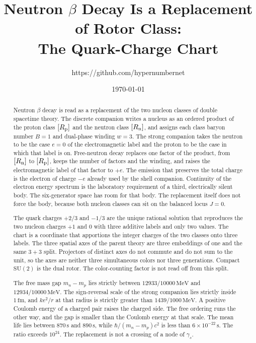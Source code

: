 \documentclass[a4paper]{article}
\title{Neutron \(\beta\) Decay Is a Replacement of Rotor Class:\\
The Quark-Charge Chart}
\author{https://github.com/hypernumbernet}
\date{\today}
\begin{document}
\maketitle

\begin{abstract}
Neutron \(\beta\) decay is read as a replacement of the two nucleon classes of double spacetime theory. The discrete companion writes a nucleus as an ordered product of the proton class \([R_{\rm p}]\) and the neutron class \([R_{\rm n}]\), and assigns each class baryon number \(B=1\) and dual-phase winding \(w=3\). The strong companion takes the neutron to be the case \(e=0\) of the electromagnetic label and the proton to be the case in which that label is on. Free-neutron decay replaces one factor of the product, from \([R_{\rm n}]\) to \([R_{\rm p}]\), keeps the number of factors and the winding, and raises the electromagnetic label of that factor to \(+e\). The emission that preserves the total charge is the electron of charge \(-e\) already used by the shell companion. Continuity of the electron energy spectrum is the laboratory requirement of a third, electrically silent body. The six-generator space has room for that body. The replacement itself does not force the body, because both nucleon classes can sit on the balanced locus \(J=0\).

The quark charges \(+2/3\) and \(-1/3\) are the unique rational solution that reproduces the two nucleon charges \(+1\) and \(0\) with three additive labels and only two values. The chart is a coordinate that apportions the integer charges of the two classes onto three labels. The three spatial axes of the parent theory are three embeddings of one and the same \(3+3\) split. Projectors of distinct axes do not commute and do not sum to the unit, so the axes are neither three simultaneous colors nor three generations. Compact \(\mathrm{SU}(2)\) is the dual rotor. The color-counting factor is not read off from this split.

The free mass gap \(m_n-m_p\) lies strictly between \(12933/10000\,\mathrm{MeV}\) and \(12934/10000\,\mathrm{MeV}\). The sign-reversal scale of the strong companion lies strictly inside \(1\,\mathrm{fm}\), and \(ke^{2}/r\) at that radius is strictly greater than \(1439/1000\,\mathrm{MeV}\). A positive Coulomb energy of a charged pair raises the charged side. The free ordering runs the other way, and the gap is smaller than the Coulomb energy at that scale. The mean life lies between \(870\,\mathrm{s}\) and \(890\,\mathrm{s}\), while \(\hbar/(m_n-m_p)c^{2}\) is less than \(6\times 10^{-22}\,\mathrm{s}\). The ratio exceeds \(10^{24}\). The replacement is not a crossing of a node of \(\gamma_s\).


\end{abstract}
\end{document}
